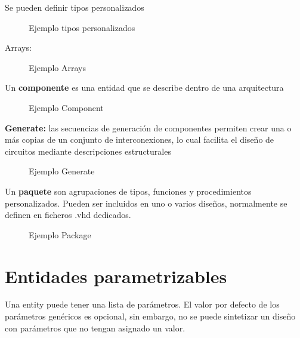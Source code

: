 Se pueden definir tipos personalizados

\begin{figure}[H]
	\centering
	
	\caption{Ejemplo tipos personalizados}
\end{figure}

Arrays:

\begin{figure}[H]
	\centering
	
	\caption{Ejemplo Arrays}
\end{figure}

Un \textbf{componente} es una entidad que se describe dentro de una arquitectura
\begin{figure}[H]
	\centering
	
	\caption{Ejemplo Component}
\end{figure}


\textbf{Generate:} las secuencias de generación de componentes permiten crear una o más copias de un conjunto de interconexiones, lo cual facilita el diseño de circuitos mediante descripciones estructurales

\begin{figure}[H]
	\centering
	
	\caption{Ejemplo Generate}
\end{figure}

Un \textbf{paquete} son agrupaciones de tipos, funciones y procedimientos personalizados. Pueden ser incluidos en uno o varios diseños, normalmente se definen en ficheros .vhd dedicados.

\begin{figure}[H]
	\centering
	
	\caption{Ejemplo Package}
\end{figure}

\section{Entidades parametrizables}
Una entity puede tener una lista de parámetros. El valor por defecto de los parámetros genéricos es opcional, sin embargo, no se puede sintetizar un diseño con parámetros que no tengan asignado un valor.

